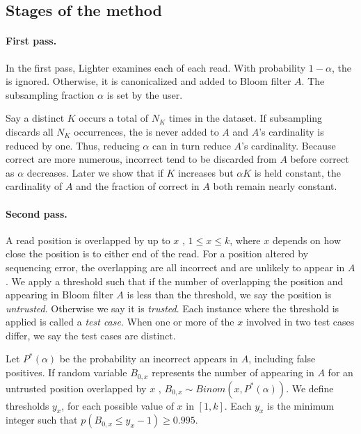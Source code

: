 \documentclass[10pt]{article}
\begin{document}
\subsection*{Stages of the method}
\paragraph{First pass.}    In the first pass, Lighter examines each \kmer of each read.  With probability $1 - \alpha$, the \kmer is ignored.  Otherwise, it is canonicalized and added to Bloom filter $A$.  The subsampling fraction $\alpha$ is set by the user.

Say a distinct \kmer $K$ occurs a total of $N_K$ times in the dataset.  If subsampling discards all $N_K$ occurrences, the \kmer is never added to $A$ and $A$'s cardinality is reduced by one.  Thus, reducing $\alpha$ can in turn reduce $A$'s cardinality.  Because correct \kmers are more numerous, incorrect \kmers tend to be discarded from $A$ before correct \kmers as $\alpha$ decreases.  Later we show that if $K$ increases but $\alpha K$ is held constant, the cardinality of $A$ and the fraction of correct \kmers in $A$ both remain nearly constant.

\paragraph{Second pass.} 
A read position is overlapped by up to $x$ \kmers, $1\le x\le k$, where $x$ depends on how close the position is to either end of the read.
For a position altered by sequencing error, the overlapping \kmers are all incorrect and are unlikely to appear in $A$.
We apply a threshold such that if the number of \kmers overlapping the position and appearing in Bloom filter $A$ is less than the threshold, we say the position is \emph{untrusted}.
Otherwise we say it is \emph{trusted}.
Each instance where the threshold is applied is called a \emph{test case}.
When one or more of the $x$ \kmers involved in two test cases differ, we say the test cases are distinct.

Let $P^*(\alpha)$ be the probability an incorrect \kmer appears in $A$, including false positives.  If random variable $B_{0,x}$ represents the number of \kmers appearing in $A$ for an untrusted position overlapped by $x$ \kmers, $B_{0,x} \sim Binom(x,P^*(\alpha))$.  We define thresholds $y_x$, for each possible value of $x$ in $[1, k]$.  Each $y_x$ is the minimum integer such that $p(B_{0,x}\le y_x - 1)\ge 0.995$.
\end{document}

